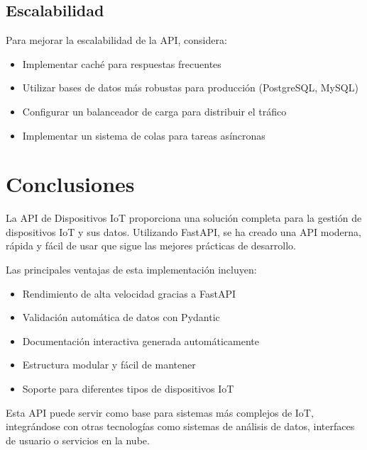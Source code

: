\documentclass[12pt,letterpaper]{report}
\begin{document}
\section{Escalabilidad}
Para mejorar la escalabilidad de la API, considera:

\begin{itemize}
    \item Implementar caché para respuestas frecuentes
    \item Utilizar bases de datos más robustas para producción (PostgreSQL, MySQL)
    \item Configurar un balanceador de carga para distribuir el tráfico
    \item Implementar un sistema de colas para tareas asíncronas
\end{itemize}

\chapter{Conclusiones}

La API de Dispositivos IoT proporciona una solución completa para la gestión de dispositivos IoT y sus datos. Utilizando FastAPI, se ha creado una API moderna, rápida y fácil de usar que sigue las mejores prácticas de desarrollo.

Las principales ventajas de esta implementación incluyen:

\begin{itemize}
    \item Rendimiento de alta velocidad gracias a FastAPI
    \item Validación automática de datos con Pydantic
    \item Documentación interactiva generada automáticamente
    \item Estructura modular y fácil de mantener
    \item Soporte para diferentes tipos de dispositivos IoT
\end{itemize}

Esta API puede servir como base para sistemas más complejos de IoT, integrándose con otras tecnologías como sistemas de análisis de datos, interfaces de usuario o servicios en la nube.
\end{document}
